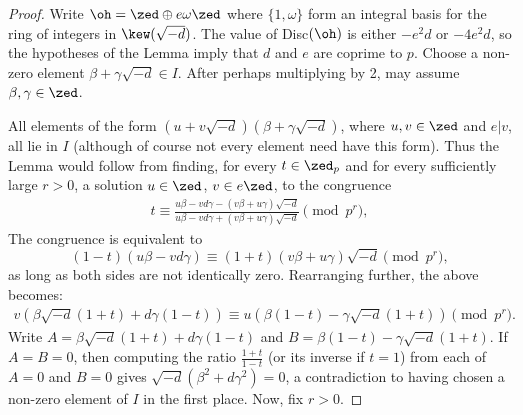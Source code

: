 \documentclass[12pt,letterpaper]{article}
\begin{document}
	\begin{proof}
		
		Write $\oh = \zed\oplus e\omega \zed$ where $\{1,\omega\}$ form an integral basis for the ring of integers in $\kew(\sqrt{-d})$. The value of Disc$(\oh)$ is either $-e^2d$ or $-4e^2d$, so the hypotheses of the Lemma imply that $d$ and $e$ are coprime to $p$. Choose a non-zero element $\beta+\gamma\sqrt{-d}\in I$. After perhaps multiplying by 2, may assume $\beta,\gamma\in \zed$. 
		
		
	
	All elements of the form $(u+v\sqrt{-d})(\beta+\gamma\sqrt{-d})$, where $u,v\in\zed$ and $e|v$, all lie in $I$ (although of course not every element need have this form). Thus the Lemma would follow from finding, for every $t\in \zed_p$ and for every sufficiently large $r>0$, a solution $u\in \zed$, $v\in e\zed$, to the congruence 
	\begin{align}\label{Case1Cong}
		t\equiv \frac{u\beta-vd\gamma-(v\beta+u\gamma)\sqrt{-d}}{u\beta-vd\gamma+(v\beta+u\gamma)\sqrt{-d}}\pmod{p^r},
	\end{align}
	The congruence is equivalent to 	
		\[
		(1-t)(u\beta-vd\gamma) \equiv (1+t)(v\beta+u\gamma)\sqrt{-d} \pmod{p^r},\] as long as both sides are not identically zero.	Rearranging further, the above becomes:		
		\begin{align*} v(\beta\sqrt{-d}(1+t)+d\gamma(1-t))\equiv u(\beta(1-t)-\gamma\sqrt{-d}(1+t))\pmod{p^r}.\end{align*}		
		Write $A = \beta\sqrt{-d}(1+t)+d\gamma(1-t)$ and $B= \beta(1-t)-\gamma\sqrt{-d}(1+t)$. If $A=B=0$, then computing the ratio $\frac{1+t}{1-t}$ (or its inverse if $t=1$) from each of $A=0$ and $B=0$ gives $\sqrt{-d}(\beta^2+d\gamma^2)=0$, a contradiction to having chosen a non-zero element of $I$ in the first place. Now, fix $r>0$.
		
	
		

\end{proof}
\end{document}
